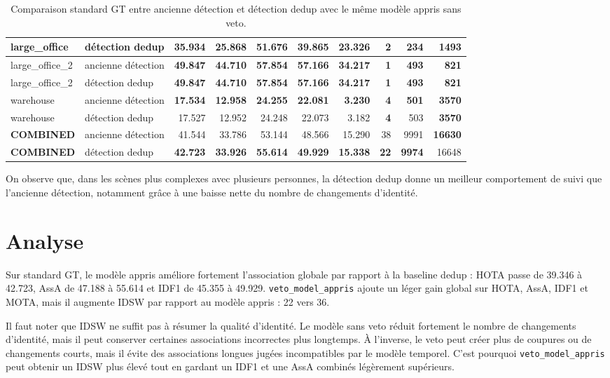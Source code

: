 \documentclass[11pt,a4paper]{article}
\begin{document}
\begin{table}[H]
{\begin{tabular}{l l r r r r r r r r}
large\_office & détection dedup & \textbf{35.934} & 25.868 & \textbf{51.676} & \textbf{39.865} & \textbf{23.326} & \textbf{2} & \textbf{234} & 1493 \\
\midrule
large\_office\_2 & ancienne détection & \textbf{49.847} & \textbf{44.710} & \textbf{57.854} & \textbf{57.166} & \textbf{34.217} & \textbf{1} & \textbf{493} & \textbf{821} \\
large\_office\_2 & détection dedup & \textbf{49.847} & \textbf{44.710} & \textbf{57.854} & \textbf{57.166} & \textbf{34.217} & \textbf{1} & \textbf{493} & \textbf{821} \\
\midrule
warehouse & ancienne détection & \textbf{17.534} & \textbf{12.958} & \textbf{24.255} & \textbf{22.081} & \textbf{3.230} & \textbf{4} & \textbf{501} & \textbf{3570} \\
warehouse & détection dedup & 17.527 & 12.952 & 24.248 & 22.073 & 3.182 & \textbf{4} & 503 & \textbf{3570} \\
\midrule
\textbf{COMBINED} & ancienne détection & 41.544 & 33.786 & 53.144 & 48.566 & 15.290 & 38 & 9991 & \textbf{16630} \\
\textbf{COMBINED} & détection dedup & \textbf{42.723} & \textbf{33.926} & \textbf{55.614} & \textbf{49.929} & \textbf{15.338} & \textbf{22} & \textbf{9974} & 16648 \\
\bottomrule
\end{tabular}
}
\caption{Comparaison standard GT entre ancienne détection et détection dedup avec le même modèle appris sans veto.}
\end{table}

On observe que, dans les scènes plus complexes avec plusieurs personnes, la détection dedup donne un meilleur comportement de suivi que l'ancienne détection, notamment grâce à une baisse nette du nombre de changements d'identité.

\section{Analyse}

Sur standard GT, le modèle appris améliore fortement l'association globale par rapport à la baseline dedup : HOTA passe de 39.346 à 42.723, AssA de 47.188 à 55.614 et IDF1 de 45.355 à 49.929. \texttt{veto\_model\_appris} ajoute un léger gain global sur HOTA, AssA, IDF1 et MOTA, mais il augmente IDSW par rapport au modèle appris : 22 vers 36. 

Il faut noter que IDSW ne suffit pas à résumer la qualité d'identité. Le modèle sans veto réduit fortement le nombre de changements d'identité, mais il peut conserver certaines associations incorrectes plus longtemps. 
À l'inverse, le veto peut créer plus de coupures ou de changements courts, mais il évite des associations longues jugées incompatibles par le modèle temporel. 
C'est pourquoi \texttt{veto\_model\_appris} peut obtenir un IDSW plus élevé tout en gardant un IDF1 et une AssA combinés légèrement supérieurs.
\end{document}
